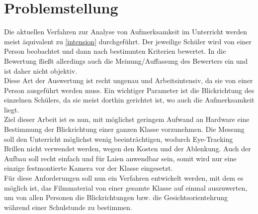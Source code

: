 \section{Problemstellung}
\label{Problemstellung}
Die aktuellen Verfahren zur Analyse von Aufmerksamkeit im Unterricht werden meist äquivalent zu \autoref{intension} durchgeführt. Der jeweilige Schüler wird von einer Person beobachtet und dann nach bestimmten Kriterien bewertet. In die Bewertung fließt allerdings auch die Meinung/Auffassung des Bewerters ein und ist daher nicht objektiv.\\
Diese Art der Auswertung ist recht ungenau und Arbeitsintensiv, da sie von einer Person ausgeführt werden muss. Ein wichtiger Parameter ist die Blickrichtung des einzelnen Schülers, da sie meist dorthin gerichtet ist, wo auch die Aufmerksamkeit liegt.\\
Ziel dieser Arbeit ist es nun, mit möglichst geringem Aufwand an Hardware eine Bestimmung der Blickrichtung einer ganzen Klasse vorzunehmen. Die Messung soll den Unterricht möglichst wenig beeinträchtigen, wodurch Eye-Tracking Brillen nicht verwendet werden, wegen den Kosten und der Ablenkung. Auch der Aufbau soll recht einfach und für Laien anwendbar sein, somit wird nur eine einzige festmontierte Kamera vor der Klasse eingesetzt.\\
Für diese Anforderungen soll nun ein Verfahren entwickelt werden, mit dem es möglich ist, das Filmmaterial von einer gesamte Klasse auf einmal auszuwerten, um von allen Personen die Blickrichtungen bzw. die Gesichtsorientehrung während einer Schulstunde zu bestimmen.\\
\cite{MAI_Verhaltensbeobachtung}